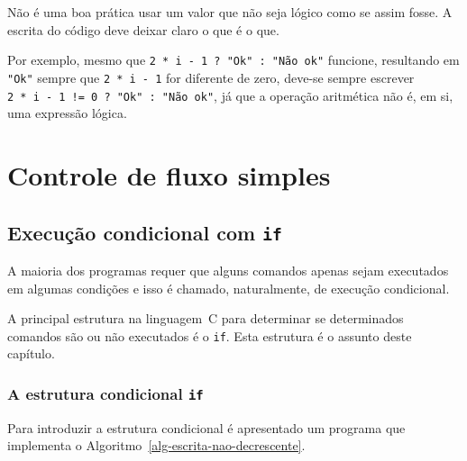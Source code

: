 \documentclass[
  11pt,
  a4paper,
]{scrbook}
\begin{document}
\begin{tcolorbox}[enhanced jigsaw, arc=.35mm, bottomtitle=1mm, colbacktitle=quarto-callout-caution-color!10!white, title=\textcolor{quarto-callout-caution-color}{\faFire}\hspace{0.5em}{Cuidado}, toprule=.15mm, left=2mm, opacityback=0, colback=white, colframe=quarto-callout-caution-color-frame, opacitybacktitle=0.6, bottomrule=.15mm, leftrule=.75mm, toptitle=1mm, coltitle=black, titlerule=0mm, rightrule=.15mm, breakable]

Não é uma boa prática usar um valor que não seja lógico como se assim
fosse. A escrita do código deve deixar claro o que é o que.

Por exemplo, mesmo que \texttt{2\ *\ i\ -\ 1\ ?\ "Ok"\ :\ "Não\ ok"}
funcione, resultando em \texttt{"Ok"} sempre que \texttt{2\ *\ i\ -\ 1}
for diferente de zero, deve-se sempre escrever
\texttt{2\ *\ i\ -\ 1\ !=\ 0\ ?\ "Ok"\ :\ "Não\ ok"}, já que a operação
aritmética não é, em si, uma expressão lógica.

\end{tcolorbox}

\part{Controle de fluxo simples}

\chapter{\texorpdfstring{Execução condicional com
\texttt{if}}{Execução condicional com if}}\label{execuuxe7uxe3o-condicional-com-if}

A maioria dos programas requer que alguns comandos apenas sejam
executados em algumas condições e isso é chamado, naturalmente, de
execução condicional.

A principal estrutura na linguagem~C para determinar se determinados
comandos são ou não executados é o \texttt{if}. Esta estrutura é o
assunto deste capítulo.

\section{\texorpdfstring{A estrutura condicional
\texttt{if}}{A estrutura condicional if}}\label{a-estrutura-condicional-if}

Para introduzir a estrutura condicional é apresentado um programa que
implementa o Algoritmo~\ref{alg-escrita-nao-decrescente}.
\end{document}
